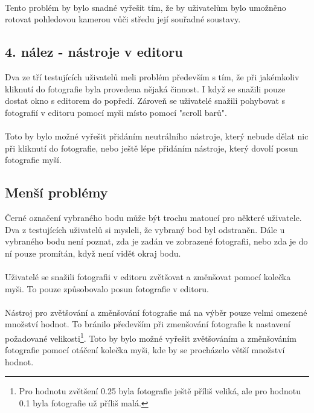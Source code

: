\documentclass[11pt,twoside,a4paper]{book}
\begin{document}
\paragraph{}
Tento problém by bylo snadné vyřešit tím, že by uživatelům bylo umožněno rotovat pohledovou kamerou vůči středu její souřadné soustavy.

\subsection{4. nález - nástroje v editoru}
Dva ze tří testujících uživatelů meli problém především s tím, že při jakémkoliv kliknutí do fotografie byla provedena nějaká činnost. I když se snažili pouze dostat okno s editorem do popředí. Zároveň se uživatelé snažili pohybovat s fotografií v editoru pomocí myši místo pomocí "scroll barů".
\paragraph{}
Toto by bylo možné vyřešit přidáním neutrálního nástroje, který nebude dělat nic při kliknutí do fotografie, nebo ještě lépe přidáním nástroje, který dovolí posun fotografie myší. 

\subsection{Menší problémy}
Černé označení vybraného bodu může být trochu matoucí pro některé uživatele. Dva z testujících uživatelů si mysleli, že vybraný bod byl odstraněn. Dále u vybraného bodu není poznat, zda je zadán ve zobrazené fotografii, nebo zda je do ní pouze promítán, když není vidět okraj bodu.
\paragraph{}
Uživatelé se snažili fotografii v editoru zvětšovat a změnšovat pomocí kolečka myši. To pouze způsobovalo posun fotografie v editoru.
\paragraph{}
Nástroj pro zvětšování a změnšování fotografie má na výběr pouze velmi omezené množství hodnot. To bránilo především při zmenšování fotografie k nastavení požadované velikosti\footnote{Pro hodnotu zvětšení 0.25 byla fotografie ještě příliš veliká, ale pro hodnotu 0.1 byla fotografie už příliš malá.}. Toto by bylo možné vyřešit zvětšováním a změnšováním fotografie pomocí otáčení kolečka myši, kde by se procházelo větší množství hodnot.
\end{document}
